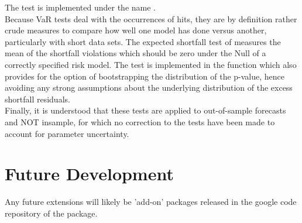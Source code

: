 The test is implemented under the name \verb@VaRDurTest@.\\
Because VaR tests deal with the occurrences of hits, they are by definition
rather crude measures to compare how well one model has done versus another,
particularly with short data sets. The expected shortfall test of \cite{McNeil2000}
measures the mean of the shortfall violations which should be zero under the Null of a
correctly specified risk model. The test is implemented in the function \verb@ESTest@
which also provides for the option of bootstrapping the distribution of the p-value,
hence avoiding any strong assumptions about the underlying distribution of the excess
shortfall residuals.\\
Finally, it is understood that these tests are applied to out-of-sample forecasts
and NOT insample, for which no correction to the tests have been made to account
for parameter uncertainty.


\section{Future Development}\label{section:fut}
Any future extensions will likely be 'add-on' packages released in the google code repository
of the package.

